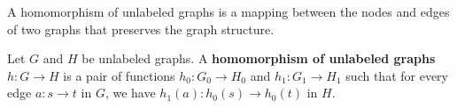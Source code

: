 A homomorphism of unlabeled graphs is a mapping between the nodes and edges of two graphs that preserves the graph structure.
\begin{definition}
    \label{def:unlabeled_graph:homomorphism}
    Let \( G \) and \( H \) be unlabeled graphs. A \textbf{homomorphism of unlabeled graphs} \( h: G \mathop{\to} H \) is a pair of functions \( h_0: G_0 \mathop{\to} H_0 \) and \( h_1: G_1 \mathop{\to} H_1 \) such that for every edge \( a: s \mathop{\to} t \) in \( G \), we have \( h_1(a) : h_0(s) \mathop{\to} h_0(t) \) in \( H \).
\end{definition}
    